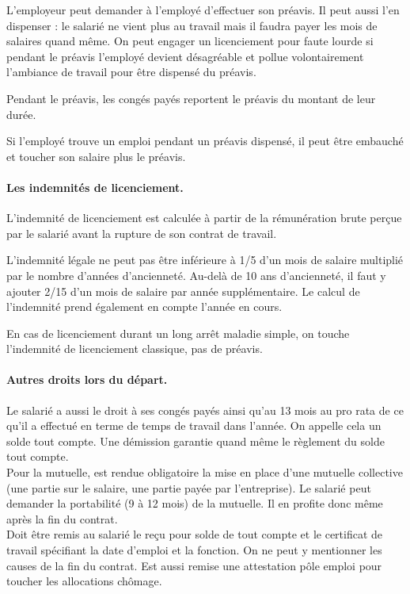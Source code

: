 L’employeur peut demander à l’employé d’effectuer son préavis.
Il peut aussi l’en dispenser : le salarié ne vient plus au travail mais il faudra payer les mois de salaires quand même.
On peut engager un licenciement pour faute lourde si pendant le préavis l’employé devient désagréable et pollue volontairement l’ambiance de travail pour être dispensé du préavis.

Pendant le préavis, les congés payés reportent le préavis du montant de leur durée.

Si l’employé trouve un emploi pendant un préavis dispensé, il peut être embauché et toucher son salaire plus le préavis.


\paragraph{Les indemnités de licenciement.}
L'indemnité de licenciement est calculée à partir de la rémunération brute perçue par le salarié avant la rupture de son contrat de travail.

L'indemnité légale ne peut pas être inférieure à 1/5 d'un mois de salaire multiplié par le nombre d'années d'ancienneté. Au-delà de 10 ans d'ancienneté, il faut y ajouter 2/15 d'un mois de salaire par année supplémentaire.
Le calcul de l'indemnité prend également en compte l'année en cours.

En cas de licenciement durant un long arrêt maladie simple, on touche l’indemnité de licenciement classique, pas de préavis.


\paragraph{Autres droits lors du départ.}
Le salarié a aussi le droit à ses congés payés ainsi qu'au 13 mois au pro rata de ce qu’il a effectué en terme de temps de travail dans l’année.
On appelle cela un solde tout compte.
Une démission garantie quand même le règlement du solde tout compte.\\

Pour la mutuelle, est rendue obligatoire la mise en place d’une mutuelle collective (une partie sur le salaire, une partie payée par l’entreprise).
Le salarié peut demander la portabilité (9 à 12 mois) de la mutuelle.
Il en profite donc même après la fin du contrat.\\

Doit être remis au salarié le reçu pour solde de tout compte et le certificat de travail spécifiant la date d’emploi et la fonction.
On ne peut y mentionner les causes de la fin du contrat.
Est aussi remise une attestation pôle emploi pour toucher les allocations chômage.\\

